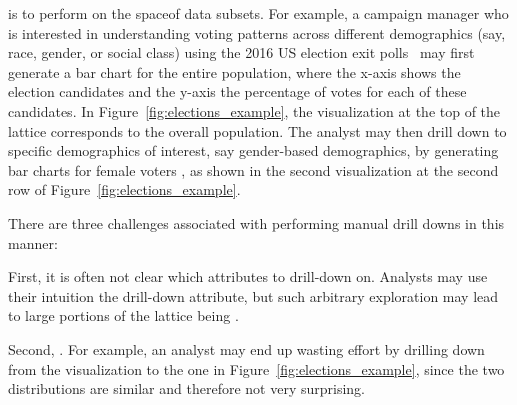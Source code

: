 is to perform 
on the spaceof data subsets.
For example, a campaign manager
who is interested in understanding
voting patterns across different
demographics (say, race, gender, or social class)
using the 2016 US election exit polls~\cite{exitpolls}
may first generate a bar chart for the entire population,
where the x-axis shows the election candidates
and the y-axis  the percentage of votes for each of these candidates.
In Figure~\ref{fig:elections_example},
the visualization at the top of the lattice
corresponds to the overall population.
The analyst may then 
drill down to specific demographics of interest,
say gender-based demographics,
by generating bar charts for female voters ,
as shown in the second visualization
at the second row of Figure~\ref{fig:elections_example}.

There are three challenges associated
with performing manual drill downs in this manner:

\smallskip
\noindent
First, it is often not clear which attributes to
drill-down on. Analysts may use their
intuition  the drill-down attribute,
but such arbitrary exploration  may lead to
large portions of the lattice being .

\smallskip
\noindent
Second, .
For example, an analyst may end up
wasting effort by drilling down
from the \blk visualization to the \blkfem one in Figure~\ref{fig:elections_example},
since the two distributions are similar and therefore not very surprising.

